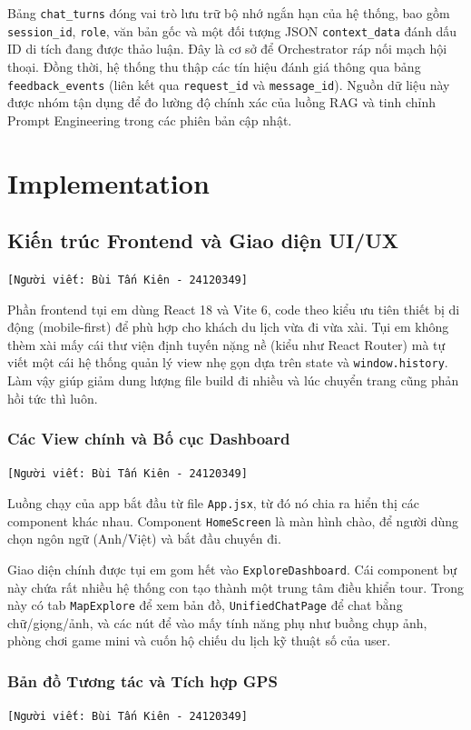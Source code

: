 Bảng \texttt{chat\_turns} đóng vai trò lưu trữ bộ nhớ ngắn hạn của hệ thống, bao gồm \texttt{session\_id}, \texttt{role}, văn bản gốc và một đối tượng JSON \texttt{context\_data} đánh dấu ID di tích đang được thảo luận. Đây là cơ sở để Orchestrator ráp nối mạch hội thoại. 
Đồng thời, hệ thống thu thập các tín hiệu đánh giá thông qua bảng \texttt{feedback\_events} (liên kết qua \texttt{request\_id} và \texttt{message\_id}). Nguồn dữ liệu này được nhóm tận dụng để đo lường độ chính xác của luồng RAG và tinh chỉnh Prompt Engineering trong các phiên bản cập nhật.

\section{Implementation}

\subsection{Kiến trúc Frontend và Giao diện UI/UX}
\texttt{[Người viết: Bùi Tấn Kiên - 24120349]}

Phần frontend tụi em dùng React 18 và Vite 6, code theo kiểu ưu tiên thiết bị di động (mobile-first) để phù hợp cho khách du lịch vừa đi vừa xài. Tụi em không thèm xài mấy cái thư viện định tuyến nặng nề (kiểu như React Router) mà tự viết một cái hệ thống quản lý view nhẹ gọn dựa trên state và \texttt{window.history}. Làm vậy giúp giảm dung lượng file build đi nhiều và lúc chuyển trang cũng phản hồi tức thì luôn.

\subsubsection{Các View chính và Bố cục Dashboard}
\texttt{[Người viết: Bùi Tấn Kiên - 24120349]}

Luồng chạy của app bắt đầu từ file \texttt{App.jsx}, từ đó nó chia ra hiển thị các component khác nhau. Component \texttt{HomeScreen} là màn hình chào, để người dùng chọn ngôn ngữ (Anh/Việt) và bắt đầu chuyến đi.

Giao diện chính được tụi em gom hết vào \texttt{ExploreDashboard}. Cái component bự này chứa rất nhiều hệ thống con tạo thành một trung tâm điều khiển tour. Trong này có tab \texttt{MapExplore} để xem bản đồ, \texttt{UnifiedChatPage} để chat bằng chữ/giọng/ảnh, và các nút để vào mấy tính năng phụ như buồng chụp ảnh, phòng chơi game mini và cuốn hộ chiếu du lịch kỹ thuật số của user.

\subsubsection{Bản đồ Tương tác và Tích hợp GPS}
\texttt{[Người viết: Bùi Tấn Kiên - 24120349]}

